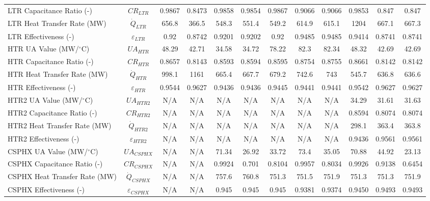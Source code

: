 \begin{specialtable}[H]
{\begin{tabular}{lccccccccccc}
    LTR Capacitance Ratio (-)	&	$CR_{LTR}$	&	0.9867	&	0.8473	&	0.9858	&	0.9854	&	0.9867	&	0.9066	&	0.9066	&	0.9853	&	0.847	&	0.847	\\
    LTR Heat Transfer Rate (MW)	&	$\dot{Q}_{LTR}$	&	656.8	&	366.5	&	548.3	&	551.4	&	549.2	&	614.9	&	615.1	&	1204	&	667.1	&	667.3	\\
    LTR Effectiveness (-)	&	$\varepsilon_{LTR}$	&	0.92	&	0.8742	&	0.9201	&	0.9202	&	0.92	&	0.9485	&	0.9485	&	0.9414	&	0.8741	&	0.8741	\\
    HTR UA Value (MW/$^{\circ}$C)	&	$UA_{HTR}$	&	48.29	&	42.71	&	34.58	&	34.72	&	78.22	&	82.3	&	82.34	&	48.32	&	42.69	&	42.69	\\
    HTR Capacitance Ratio (-)	&	$CR_{HTR}$	&	0.8657	&	0.8143	&	0.8593	&	0.8594	&	0.8595	&	0.8754	&	0.8755	&	0.8661	&	0.8142	&	0.8142	\\
    HTR Heat Transfer Rate (MW)	&	$\dot{Q}_{HTR}$	&	998.1	&	1161	&	665.4	&	667.7	&	679.2	&	742.6	&	743	&	545.7	&	636.8	&	636.6	\\
    HTR Effectiveness (-)	&	$\varepsilon_{HTR}$	&	0.9544	&	0.9627	&	0.9436	&	0.9436	&	0.9445	&	0.9441	&	0.9441	&	0.9542	&	0.9627	&	0.9627	\\
    HTR2 UA Value (MW/$^{\circ}$C)	&	$UA_{HTR2}$	&	N/A	&	N/A	&	N/A	&	N/A	&	N/A	&	N/A	&	N/A	&	34.29	&	31.61	&	31.63	\\
    HTR2 Capacitance Ratio (-)	&	$CR_{HTR2}$	&	N/A	&	N/A	&	N/A	&	N/A	&	N/A	&	N/A	&	N/A	&	0.8594	&	0.8074	&	0.8074	\\
    HTR2 Heat Transfer Rate (MW)	&	$\dot{Q}_{HTR2}$	&	N/A	&	N/A	&	N/A	&	N/A	&	N/A	&	N/A	&	N/A	&	298.1	&	363.4	&	363.8	\\
    HTR2 Effectiveness (-)	&	$\varepsilon_{HTR2}$	&	N/A	&	N/A	&	N/A	&	N/A	&	N/A	&	N/A	&	N/A	&	0.9436	&	0.9561	&	0.9561	\\
    CSPHX UA Value (MW/$^{\circ}$C)	&	$UA_{CSPHX}$	&	N/A	&	N/A	&	71.34	&	26.92	&	33.72	&	73.4	&	35.05	&	70.88	&	44.92	&	23.13	\\
    CSPHX Capacitance Ratio (-)	&	$CR_{CSPHX}$	&	N/A	&	N/A	&	0.9924	&	0.701	&	0.8104	&	0.9957	&	0.8034	&	0.9926	&	0.9138	&	0.6454	\\
    CSPHX Heat Transfer Rate (MW)	&	$\dot{Q}_{CSPHX}$	&	N/A	&	N/A	&	757.6	&	760.8	&	751.3	&	751.5	&	751.9	&	751.3	&	751.3	&	751.9	\\
    CSPHX Effectiveness (-)	&	$\varepsilon_{CSPHX}$	&	N/A	&	N/A	&	0.945	&	0.945	&	0.945	&	0.9381	&	0.9374	&	0.9450	&	0.9493	&	0.9493	\\

    \bottomrule
    \end{tabular}
    }
\end{specialtable}

